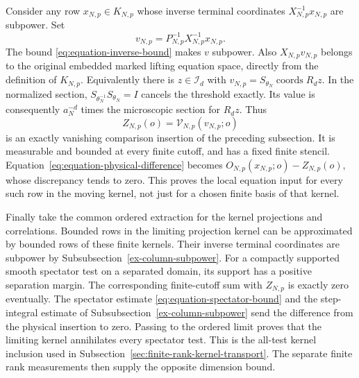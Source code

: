Consider any row $x_{N,p}\in K_{N,p}$ whose inverse terminal coordinates
$X_{N,p}^{-1}x_{N,p}$ are subpower. Set
\[
                 v_{N,p}=P_{N,p}^{-1}X_{N,p}^{-1}x_{N,p}.
\]
The bound \eqref{eq:equation-inverse-bound} makes $v$ subpower. Also
$X_{N,p}v_{N,p}$ belongs to the original embedded marked lifting equation
space, directly from the definition of $K_{N,p}$. Equivalently there
is $z\in\mathcal I_d$ with
$v_{N,p}=S_{\theta_N}\operatorname{coords}R_dz$. In the normalized
section, $S_{\theta_N^{-1}}S_{\theta_N}=I$ cancels the threshold
exactly. Its value is consequently $a_N^{-d}$ times the microscopic
section for $R_dz$. Thus
\[
                         Z_{N,p}(o)=\mathcal V_{N,p}(v_{N,p};o)
\]
is an exactly vanishing comparison insertion of the preceding subsection.
It is measurable and bounded at every finite cutoff, and has a fixed
finite stencil. Equation~\eqref{eq:equation-physical-difference} becomes
$O_{N,p}(x_{N,p};o)-Z_{N,p}(o)$, whose discrepancy tends to zero.
This proves the local equation input for every such row in the moving
kernel, not just for a chosen finite basis of that kernel.

Finally take the common ordered extraction for the kernel projections
and correlations. Bounded rows in the limiting projection kernel can
be approximated by bounded rows of these finite kernels. Their inverse
terminal coordinates are subpower by Subsubsection~\ref{ex-column-subpower}.
For a compactly supported smooth spectator test on a separated domain,
its support has a positive separation margin. The corresponding
finite-cutoff sum with $Z_{N,p}$ is exactly zero eventually. The
spectator estimate \eqref{eq:equation-spectator-bound} and the
step-integral estimate of Subsubsection~\ref{ex-column-subpower} send the
difference from the physical insertion to zero. Passing to the ordered limit proves
that the limiting kernel annihilates every spectator test. This is the
all-test kernel inclusion used in
Subsection~\ref{sec:finite-rank-kernel-transport}. The separate finite rank
measurements then supply the opposite dimension bound.
